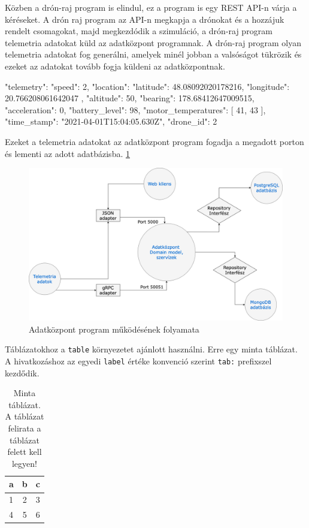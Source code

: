 Közben a drón-raj program is elindul, ez a program is egy REST API-n várja a kéréseket.
A drón raj program az API-n megkapja a drónokat és a hozzájuk rendelt csomagokat, majd megkezdódik a szimuláció, a drón-raj program telemetria adatokat küld az adatközpont programnak.
A drón-raj program olyan telemetria adatokat fog generálni, amelyek minél jobban a valsóságot tükrözik és ezeket az adatokat tovább fogja küldeni az adatközpontnak.
\begin{python}
{
    "telemetry": {
    "speed": 2,
    "location": {
    "latitude": 48.08092020178216,
    "longitude": 20.766208061642047
    },
    "altitude": 50,
    "bearing": 178.68412647009515,
    "acceleration": 0,
    "battery_level": 98,
    "motor_temperatures": [
    41,
    43
    ],
    "time_stamp": "2021-04-01T15:04:05.630Z",
    "drone_id": 2
    }
}
\end{python}

Ezeket a telemetria adatokat az adatközpont program fogadja a megadott porton és lementi az adott adatbázisba. \ref{fig:adatkozpont-flow}

\begin{figure}[h]
    \centering
    \includegraphics[scale=0.3]{images/adatkozpont-flow.png}
    \caption{Adatközpont program működésének folyamata}
    \label{fig:adatkozpont-flow}
\end{figure}



Táblázatokhoz a \texttt{table} környezetet ajánlott használni.
Erre egy minta  táblázat.
A hivatkozáshoz az egyedi \texttt{label} értéke konvenció szerint \texttt{tab:} prefixszel kezdődik.

\begin{table}[h]
\centering
\caption{Minta táblázat. A táblázat felirata a táblázat felett kell legyen!}
\label{tab:minta}
\begin{tabular}{l|c|c|}
a & b & c \\
\hline
1 & 2 & 3 \\
4 & 5 & 6 \\
\hline
\end{tabular}
\end{table}

